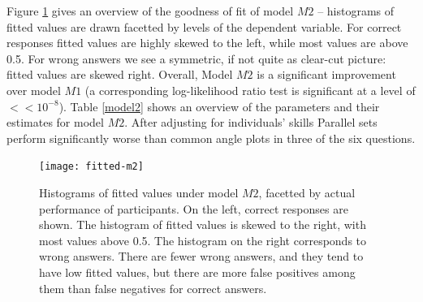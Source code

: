 Figure \ref{fitted.m2} gives an overview of the goodness of fit of model $M2$ -- histograms of fitted values are drawn facetted by levels of the dependent variable. For correct responses fitted values are highly skewed to the left,  while most values are above 0.5. For wrong answers we see a symmetric, if not quite as clear-cut picture: fitted values are skewed right. 
Overall, Model $M2$ is a significant improvement over model $M1$ (a corresponding log-likelihood ratio test is significant at a level of $<\!\!\!< 10^{-8}$).
Table \ref{model2} shows an overview of the  parameters and their estimates for model $M2$. After adjusting for individuals' skills Parallel sets perform significantly worse than common angle plots in three of the six questions. 

\begin{figure}
\texttt{[image: fitted-m2]}
\caption{\label{fitted.m2} Histograms of fitted values under model $M2$, facetted by actual performance of participants. On the left, correct responses are shown. The histogram of fitted values is skewed to the right, with most values above 0.5. The histogram on the right corresponds to wrong answers. There are fewer wrong answers, and they tend to have low fitted values, but there are more false positives among them than false negatives for correct answers. }
\end{figure}

